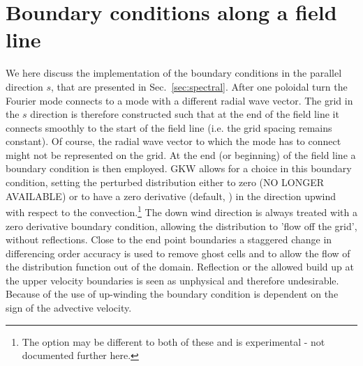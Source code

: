 \section{Boundary conditions along a field line}
We here discuss the implementation of the boundary conditions in the parallel direction $s$, that are presented in Sec.~\ref{sec:spectral}.
After one poloidal turn the Fourier mode connects to a mode with a different radial wave vector.
The grid in the $s$ direction is therefore constructed such that at the end of the field line it connects smoothly to 
the start of the field line (i.e. the grid spacing remains constant). Of course, the radial wave vector to which 
the mode has to connect might not be represented on the grid. At the end (or beginning) of the field line 
a boundary condition is then employed. GKW allows for a choice in this boundary condition, setting the 
perturbed distribution either to zero (NO LONGER AVAILABLE) or to have a zero derivative (default, ) in the direction upwind with respect
to the convection.\footnote{The option  may be different to both of these and is experimental - not documented further here.} 
The down wind direction is always treated with a zero derivative boundary condition, allowing the distribution to 
'flow off the grid', without reflections. 
Close to the end point boundaries a staggered change in differencing order accuracy is used to remove 
ghost cells and to allow the flow of the distribution function out of the domain.  
Reflection or the allowed build up at the upper velocity boundaries is seen as unphysical and therefore undesirable.  
Because of the use of up-winding the boundary condition is dependent on the sign of the advective velocity.

